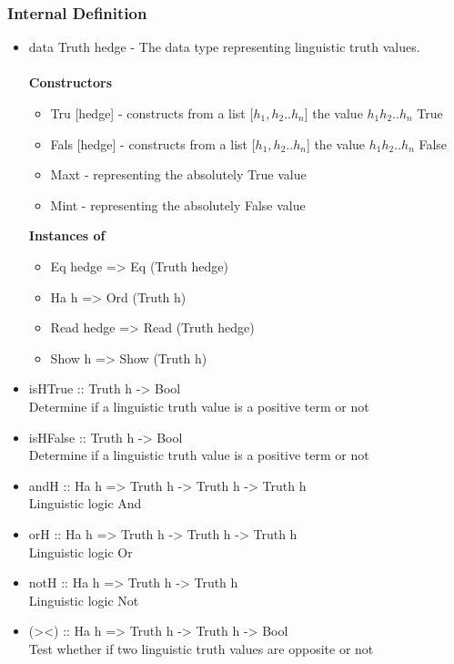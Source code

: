 \documentclass[../gr-final.tex]{subfiles}
\begin{document}
\subsubsection{Internal Definition}
\begin{itemize}
\item data Truth hedge - The data type representing linguistic
        truth values.\\\\
        {\bfseries Constructors}
      \begin{itemize}
              \item Tru [hedge] - constructs from a list
                      [$h_1,h_2..h_n$] the value $h_1 h_2 ..
                h_n$ True
        \item Fals [hedge] - constructs from a list
                      [$h_1,h_2..h_n$] the value $h_1 h_2 ..
                h_n$ False 
        \item Maxt - representing the absolutely True value
        \item Mint - representing the absolutely False value
      \end{itemize}
        {\bfseries Instances of}
        \begin{itemize}
          \item Eq hedge => Eq (Truth hedge)
          \item Ha h => Ord (Truth h)
          \item Read hedge => Read (Truth hedge)
          \item Show h => Show (Truth h)
        \end{itemize}

\item isHTrue :: Truth h -> Bool\\
        Determine if a linguistic truth value is a positive term
        or not
\item isHFalse :: Truth h -> Bool\\
        Determine if a linguistic truth value is a positive term
        or not
\item andH :: Ha h => Truth h -> Truth h -> Truth h\\
        Linguistic logic And
\item orH :: Ha h => Truth h -> Truth h -> Truth h\\
        Linguistic logic Or
\item notH :: Ha h => Truth h -> Truth h\\
        Linguistic logic Not
\item (><) :: Ha h => Truth h -> Truth h -> Bool\\
        Test whether if two linguistic truth values are opposite or not
\end{itemize}
\end{document}
